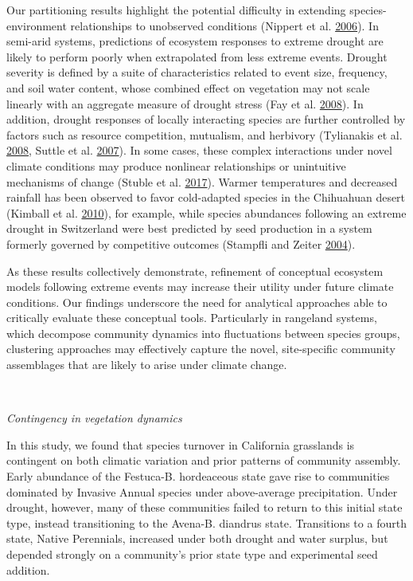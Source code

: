 \documentclass[twoside,12pt,final]{ucthesis-CA2012}
\begin{document}
\begin{ucmainmatter}
Our partitioning results highlight the potential difficulty in extending species-environment relationships to unobserved conditions (Nippert et al. \protect\hyperlink{ref-Nippert2006}{2006}).
In semi-arid systems, predictions of ecosystem responses to extreme drought are likely to perform poorly when extrapolated from less extreme events.
Drought severity is defined by a suite of characteristics related to event size, frequency, and soil water content, whose combined effect on vegetation may not scale linearly with an aggregate measure of drought stress (Fay et al. \protect\hyperlink{ref-Fay2008}{2008}).
In addition, drought responses of locally interacting species are further controlled by factors such as resource competition, mutualism, and herbivory (Tylianakis et al. \protect\hyperlink{ref-Tylianakis2008}{2008}, Suttle et al. \protect\hyperlink{ref-Suttle2007}{2007}).
In some cases, these complex interactions under novel climate conditions may produce nonlinear relationships or unintuitive mechanisms of change (Stuble et al. \protect\hyperlink{ref-Stuble2017}{2017}).
Warmer temperatures and decreased rainfall has been observed to favor cold-adapted species in the Chihuahuan desert (Kimball et al. \protect\hyperlink{ref-Kimball2010}{2010}), for example, while species abundances following an extreme drought in Switzerland were best predicted by seed production in a system formerly governed by competitive outcomes (Stampfli and Zeiter \protect\hyperlink{ref-Stampfli2004}{2004}).

As these results collectively demonstrate, refinement of conceptual ecosystem models following extreme events may increase their utility under future climate conditions.
Our findings underscore the need for analytical approaches able to critically evaluate these conceptual tools.
Particularly in rangeland systems, which decompose community dynamics into fluctuations between species groups, clustering approaches may effectively capture the novel, site-specific community assemblages that are likely to arise under climate change.

~

\emph{Contingency in vegetation dynamics}

In this study, we found that species turnover in California grasslands is contingent on both climatic variation and prior patterns of community assembly.
Early abundance of the Festuca-B. hordeaceous state gave rise to communities dominated by Invasive Annual species under above-average precipitation.
Under drought, however, many of these communities failed to return to this initial state type, instead transitioning to the Avena-B. diandrus state.
Transitions to a fourth state, Native Perennials, increased under both drought and water surplus, but depended strongly on a community's prior state type and experimental seed addition.


\end{ucmainmatter}
\end{document}
